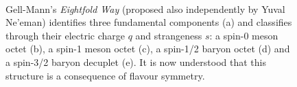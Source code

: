 \begin{figure}[htb]\begin{center}
	\\
	\caption{Gell-Mann's \textit{Eightfold Way} (proposed also independently 
          by Yuval Ne'eman) identifies three fundamental components (a) 
          and classifies through their electric charge $q$ and strangeness $s$:
          a spin-0 meson octet (b), a spin-1 meson octet (c), 
          a spin-1/2 baryon octet (d) and a spin-3/2 baryon decuplet (e).
          It is now understood that this structure is a 
          consequence of flavour symmetry.\label{fig:eightfold}}
\end{center}\end{figure}

